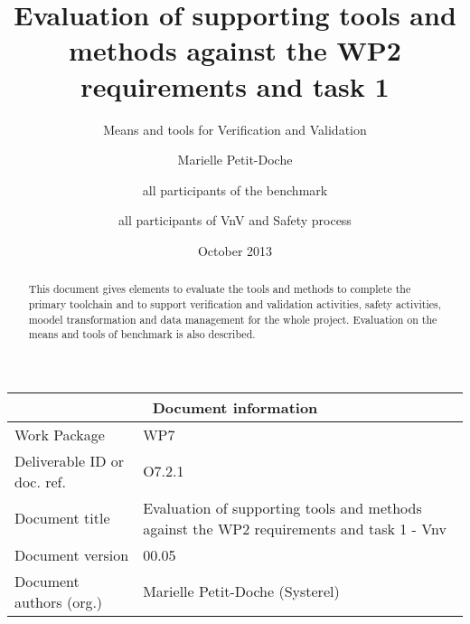 \documentclass{template/openetcs_report}
\begin{document}
\frontmatter
{}




\title{Evaluation of supporting tools and methods against the WP2 requirements and task 1}

\subtitle{Means and tools for Verification and Validation}

\date{October 2013}


\author{Marielle Petit-Doche}


\author{all participants of the benchmark}


\author{all participants of VnV  and Safety process}


 


\begin{abstract}
This document gives elements to evaluate the tools and methods to complete the primary toolchain and to support verification and validation activities, safety activities, moodel transformation and data management for the whole project.
 Evaluation on the means and tools of benchmark is also described.

\end{abstract}

\maketitle
\tableofcontents
\listoffiguresandtables
\newpage


\begin{tabular}{|p{4.4cm}|p{8.7cm}|}
\hline
\multicolumn{2}{|c|}{Document information} \\
\hline
Work Package &  WP7  \\
Deliverable ID or doc. ref. & O7.2.1\\
\hline
Document title & Evaluation of supporting tools and methods against the WP2 requirements and task 1 - Vnv \\
Document version & 00.05 \\
Document authors (org.)  & Marielle Petit-Doche (Systerel)  \\
\hline
\end{tabular}
\end{document}
